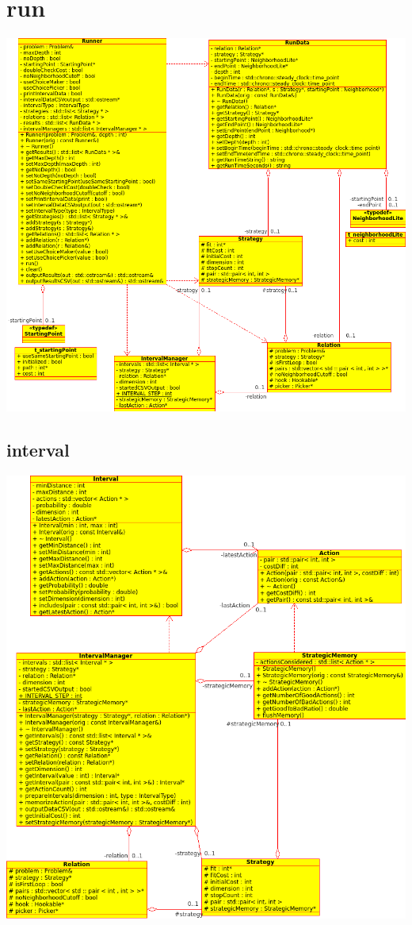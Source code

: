 \documentclass[a4paper,10pt]{report}
\begin{document}
\section{run}
\includegraphics[width=\textwidth]{../UML/run.png}

\subsection{interval}
\includegraphics[width=\textwidth]{../UML/interval.png}
\end{document}
